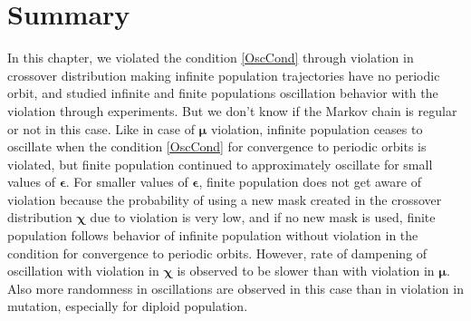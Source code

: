 \section{Summary}
In this chapter, we violated the condition \ref{OscCond} through violation in crossover distribution 
making infinite population trajectories have no periodic orbit, and 
studied infinite and finite populations oscillation behavior with the violation through experiments. 
But we don't know if the Markov chain is regular or not in this case. 
Like in case of $\bm{\mu}$ violation, infinite population ceases to oscillate when the condition \ref{OscCond} for convergence to 
periodic orbits is violated, but finite population continued to approximately oscillate for small values of $\bm{\epsilon}$. 
For smaller values of $\bm{\epsilon}$, finite population does not get aware of violation because the probability of using 
a new mask created in the crossover distribution $\bm{\chi}$ due to violation is very low, and 
if no new mask is used, finite population follows behavior of infinite population without violation in the condition for convergence to 
periodic orbits. However, rate of dampening of oscillation with violation 
in $\bm{\chi}$ is observed to be slower than with violation in ${\bm{\mu}}$. Also more randomness in oscillations are observed 
in this case than in violation in mutation, especially for diploid population.




